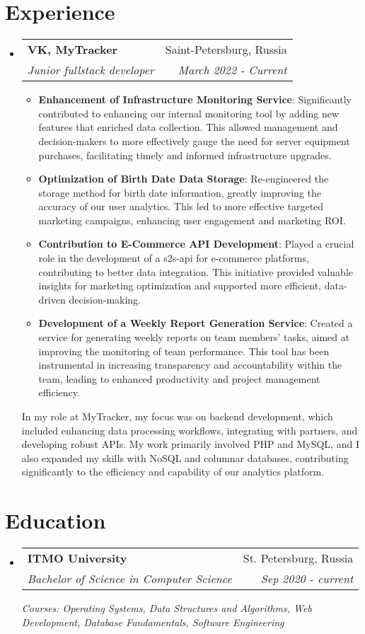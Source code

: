 \documentclass[letterpaper,10.8pt]{article}
\makeatletter
\newcommand{\resumeItem}[2]{
    \item\small{
        \textbf{#1}{: #2 \vspace{-2pt}}
    }
}
\newcommand{\resumeSubheading}[4]{
    \vspace{-1pt}\item
    \begin{tabular*}{0.97\textwidth}{l@{\extracolsep{\fill}}r}
        \textbf{#1}       & #2                 \\
        \textit{\small#3} & \textit{\small #4} \\
    \end{tabular*}\vspace{-5pt}
}
\newcommand{\resumeSubHeadingListStart}{\begin{itemize}[leftmargin=*]}
\newcommand{\resumeSubHeadingListEnd}{\end{itemize}}
\newcommand{\resumeItemListStart}{\begin{itemize}}
\newcommand{\resumeItemListEnd}{\end{itemize}\vspace{-5pt}}
\makeatother
\begin{document}
\section{Experience}
\resumeSubHeadingListStart
\resumeSubheading
{VK, MyTracker}{Saint-Petersburg, Russia}
{Junior fullstack developer}{March 2022 - Current}
\resumeItemListStart
\resumeItem{Enhancement of Infrastructure Monitoring Service}
{Significantly contributed to enhancing our internal monitoring tool by adding new features that enriched data collection. This allowed management and decision-makers to more effectively gauge the need for server equipment purchases, facilitating timely and informed infrastructure upgrades.}
\resumeItem{Optimization of Birth Date Data Storage}
{Re-engineered the storage method for birth date information, greatly improving the accuracy of our user analytics. This led to more effective targeted marketing campaigns, enhancing user engagement and marketing ROI.}
\resumeItem{Contribution to E-Commerce API Development}{Played a crucial role in the development of a s2s-api for e-commerce platforms, contributing to better data integration. This initiative provided valuable insights for marketing optimization and supported more efficient, data-driven decision-making.}
\resumeItem{Development of a Weekly Report Generation Service}{Created a service for generating weekly reports on team members' tasks, aimed at improving the monitoring of team performance. This tool has been instrumental in increasing transparency and accountability within the team, leading to enhanced productivity and project management efficiency.}
\resumeItemListEnd
{In my role at MyTracker, my focus was on backend development, which included enhancing data processing workflows, integrating with partners, and developing robust APIs. My work primarily involved PHP and MySQL, and I also expanded my skills with NoSQL and columnar databases, contributing significantly to the efficiency and capability of our analytics platform.}
\resumeSubHeadingListEnd


\section{Education}
\resumeSubHeadingListStart
\resumeSubheading
{ITMO University}{St. Petersburg, Russia}
{Bachelor of Science in Computer Science}{Sep 2020 - current}

{\scriptsize \textit{
Courses:
Operating Systems,
Data Structures and Algorithms,
Web Development,
Database Fundamentals,
Software Engineering
}}
\resumeSubHeadingListEnd
\end{document}
